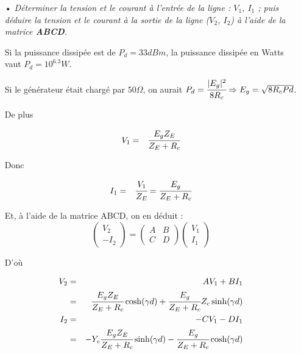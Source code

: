 \documentclass[10pt]{article}
\begin{document}
\begin{itemize}
    \item[•] \textit{Déterminer la tension et le courant à l'entrée de la ligne : $V_1$, $I_1$ ; puis déduire la tension et le courant à la sortie de la ligne ($V_2$, $I_2$) à l'aide de la matrice \textbf{ABCD}.}

        Si la puissance dissipée est de $P_d = 33 dBm$, la puissance dissipée en Watts vaut $P_d = 10^{6.3}W$.

        Si le générateur était chargé par $50 \Omega$, on aurait $P_d = \cfrac{|E_g|^2}{8R_c} \Rightarrow E_g = \sqrt{8 R_c Pd}$.

        De plus

        \begin{eqnarray}
            V_1 &=& \cfrac{E_g Z_E}{Z_E+R_c}
        \end{eqnarray}

        Donc

        \begin{eqnarray}
            I_1 &=& \cfrac{V_1}{Z_E} = \cfrac{E_g}{Z_E+R_c}
        \end{eqnarray}

        Et, à l'aide de la matrice ABCD, on en déduit : 
        \[
            \begin{pmatrix}
                V_2 \\
                -I_2
            \end{pmatrix}
            =
            \begin{pmatrix}
                A & B \\
                C & D
            \end{pmatrix}
            \begin{pmatrix}
                V_1 \\
                I_1
            \end{pmatrix}
        \]

        D'où

        \begin{eqnarray}
            V_2 &=& A V_1 + B I_1 \nonumber \\
            &=& \cfrac{E_g Z_E}{Z_E+R_c} \cosh(\gamma d) + \cfrac{E_g}{Z_E+R_c} Z_c \sinh(\gamma d)\\
            I_2 &=& -C V_1 - D I_1 \nonumber \\
            &=& - Y_c \cfrac{E_g Z_E}{Z_E+R_c} \sinh(\gamma d) - \cfrac{E_g}{Z_E+R_c} \cosh(\gamma d)
        \end{eqnarray}


\end{itemize}
\end{document}

